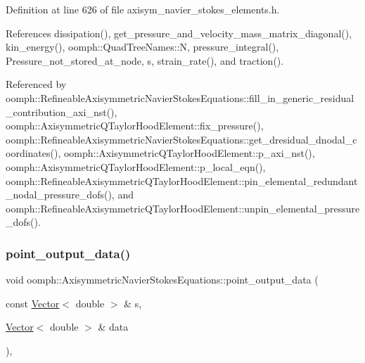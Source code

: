Definition at line 626 of file axisym\+\_\+navier\+\_\+stokes\+\_\+elements.\+h.



References dissipation(), get\+\_\+pressure\+\_\+and\+\_\+velocity\+\_\+mass\+\_\+matrix\+\_\+diagonal(), kin\+\_\+energy(), oomph\+::\+Quad\+Tree\+Names\+::N, pressure\+\_\+integral(), Pressure\+\_\+not\+\_\+stored\+\_\+at\+\_\+node, s, strain\+\_\+rate(), and traction().



Referenced by oomph\+::\+Refineable\+Axisymmetric\+Navier\+Stokes\+Equations\+::fill\+\_\+in\+\_\+generic\+\_\+residual\+\_\+contribution\+\_\+axi\+\_\+nst(), oomph\+::\+Axisymmetric\+Q\+Taylor\+Hood\+Element\+::fix\+\_\+pressure(), oomph\+::\+Refineable\+Axisymmetric\+Navier\+Stokes\+Equations\+::get\+\_\+dresidual\+\_\+dnodal\+\_\+coordinates(), oomph\+::\+Axisymmetric\+Q\+Taylor\+Hood\+Element\+::p\+\_\+axi\+\_\+nst(), oomph\+::\+Axisymmetric\+Q\+Taylor\+Hood\+Element\+::p\+\_\+local\+\_\+eqn(), oomph\+::\+Refineable\+Axisymmetric\+Q\+Taylor\+Hood\+Element\+::pin\+\_\+elemental\+\_\+redundant\+\_\+nodal\+\_\+pressure\+\_\+dofs(), and oomph\+::\+Refineable\+Axisymmetric\+Q\+Taylor\+Hood\+Element\+::unpin\+\_\+elemental\+\_\+pressure\+\_\+dofs().

\mbox{\label{classoomph_1_1AxisymmetricNavierStokesEquations_a011b01b75649aaeba4cf759ba5e4b9e8}} 
\subsubsection{\texorpdfstring{point\+\_\+output\+\_\+data()}{point\_output\_data()}}
{\footnotesize\ttfamily void oomph\+::\+Axisymmetric\+Navier\+Stokes\+Equations\+::point\+\_\+output\+\_\+data (\begin{DoxyParamCaption}\item[{const \hyperlink{classoomph_1_1Vector}{Vector}$<$ double $>$ \&}]{s,  }\item[{\hyperlink{classoomph_1_1Vector}{Vector}$<$ double $>$ \&}]{data }\end{DoxyParamCaption})\hspace{0.3cm}{\ttfamily [inline]}, {\ttfamily [virtual]}}



